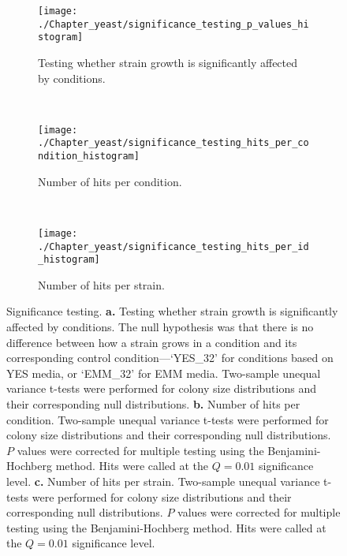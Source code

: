 \begin{figure}[!phbt]
    \centering
    \begin{subfigure}{0.75\textwidth}
        \centering
        \texttt{[image: ./Chapter\_yeast/significance\_testing\_p\_values\_histogram]}
        \caption{%
            Testing whether strain growth is significantly affected by conditions.
        }
        \label{fig:significance-testing-p-values}
    \end{subfigure}
    ~
    \begin{subfigure}{0.49\textwidth}
        \centering
        \texttt{[image: ./Chapter\_yeast/significance\_testing\_hits\_per\_condition\_histogram]}
        \caption{%
            Number of hits per condition.
        }
        \label{fig:significance-testing-hits-per-condition}
    \end{subfigure}
    ~
    \begin{subfigure}{0.49\textwidth}
        \centering
        \texttt{[image: ./Chapter\_yeast/significance\_testing\_hits\_per\_id\_histogram]}
        \caption{%
            Number of hits per strain.
        }
        \label{fig:significance-testing-hits-per-id}
    \end{subfigure}

    \caption{%
        Significance testing.
        \textbf{a.}
        Testing whether strain growth is significantly affected by conditions.
        The null hypothesis was that there is no difference between how a strain grows in a condition and its corresponding control condition---‘YES\_32’ for conditions based on YES media, or ‘EMM\_32’ for EMM media.
        Two-sample unequal variance t-tests were performed for colony size distributions and their corresponding null distributions.
        \textbf{b.}
        Number of hits per condition.
        Two-sample unequal variance t-tests were performed for colony size distributions and their corresponding null distributions.
        $P$ values were corrected for multiple testing using the Benjamini-Hochberg method.
        Hits were called at the $Q = 0.01$ significance level.
        \textbf{c.}
        Number of hits per strain.
        Two-sample unequal variance t-tests were performed for colony size distributions and their corresponding null distributions.
        $P$ values were corrected for multiple testing using the Benjamini-Hochberg method.
        Hits were called at the $Q = 0.01$ significance level.
    }
\end{figure}

